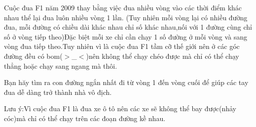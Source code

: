 Cuộc đua F1 năm 2009 thay bằng việc đua nhiều vòng vào các thời điểm khác nhau thể lại đua luôn nhiều vòng 1 lần. (Tuy nhiên mỗi vòng lại có nhiều đường đua, mỗi đường có chiều dài khác nhau chỉ số khác nhau,nối với 1 đường cùng chỉ số ở vòng tiếp theo)Đặc biệt mỗi xe chỉ cần chạy 1 số đường ở mỗi vòng và sang vòng đua tiếp theo.Tuy nhiên vì là cuộc đua F1 tầm cỡ thế giới nên ở các góc đường đều có bom($>$\_$<$)nên không thể chạy chéo được mà chỉ có thể chạy thẳng hoặc chạy sang ngang mà thôi.  

   Bạn hăy tìm ra con đường ngắn nhất đi từ vòng 1 đến vòng cuối để giúp các tay đua dễ dàng trở thành nhà vô địch.  

   Lưu ý:Vì cuộc đua F1 là đua xe ô tô nên các xe sẽ không thể bay được(nhảy cóc)mà chỉ có thể chạy trên các đoạn đường kề nhau.